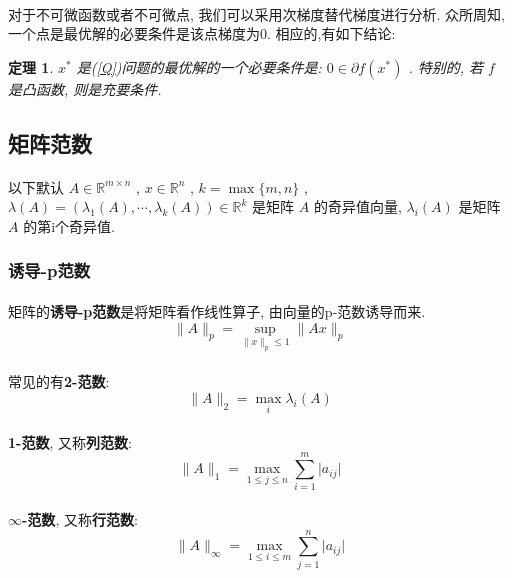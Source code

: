 \documentclass[UTF8]{ctexart}
\newtheorem{theo}{\bf 定理}[section]
\renewcommand{\b}{\textbf}
\newcommand{\abs}[1]{\lvert#1\rvert}
\newcommand{\norm}[1]{\lVert#1\rVert}
\newcommand{\Real}[1]{\mathbb{R}^{#1}}
\numberwithin{equation}{section}
\begin{document}
			\paragraph{}
				\quad 对于不可微函数或者不可微点, 我们可以采用次梯度替代梯度进行分析. 众所周知, 一个点是最优解的必要条件是该点梯度为0. 相应的,有如下结论:
			\begin{theo}
				$x^*$ 是(\ref{Q})问题的最优解的一个必要条件是: $0 \in \partial f(x^*)$ . 特别的, 若 $f$ 是凸函数, 则是充要条件.
			\end{theo}

		\subsection{矩阵范数}
			\paragraph{}
				\quad 以下默认 $A \in \Real{m \times n}$ , $x \in \Real{n}$ , $k = \max \{m, n\}$ , $\lambda(A) = (\lambda_1(A), \cdots, \lambda_k(A)) \in \Real{k}$ 是矩阵 $A$ 的奇异值向量, $\lambda_i(A)$ 是矩阵 $A$ 的第i个奇异值.
			\subsubsection{诱导-p范数}
				\paragraph{}
					\quad 矩阵的\b{诱导-p范数}是将矩阵看作线性算子, 由向量的p-范数诱导而来.
					\[
						\norm{A}_p = \sup_{\norm{x}_p \leq 1}\norm{Ax}_p
					\]

				\paragraph{}
					\quad 常见的有\b{2-范数}:
					\[
						\norm{A}_2 = \max_i \lambda_i(A)
					\]

				\paragraph{}
					\quad \b{1-范数}, 又称\b{列范数}:
					\[
						\norm{A}_1 = \max_{1 \leq j \leq n}\sum_{i = 1}^m \abs{a_{ij}}
					\]

				\paragraph{}
					\quad \b{$\infty$-范数}, 又称\b{行范数}:
					\[
						\norm{A}_\infty = \max_{1 \leq i \leq m}\sum_{j = 1}^n \abs{a_{ij}}
					\]
\end{document}
